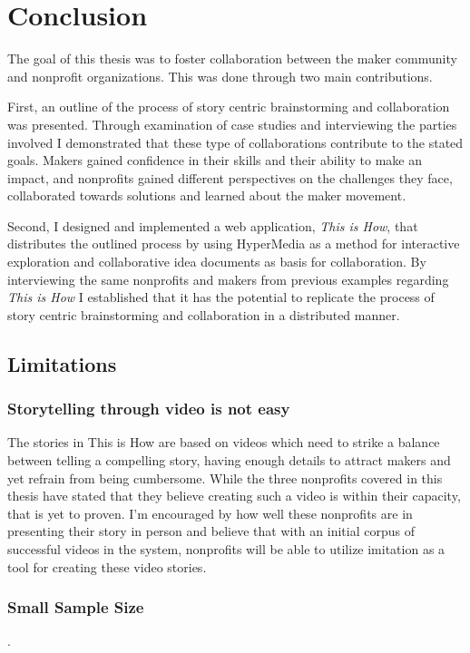 \chapter{Conclusion}
\label{chap_conclusion}

The goal of this thesis was to foster collaboration between the maker community and nonprofit organizations. This was done through two main contributions. 

First, an outline of the process of story­ centric brainstorming and collaboration was presented. Through examination of case studies and interviewing the parties involved I demonstrated that these type of collaborations contribute to the stated goals. Makers gained confidence in their skills and their ability to make an impact, and nonprofits gained different perspectives on the challenges they face, collaborated towards solutions and learned about the maker movement. 

Second, I designed and implemented a web application, \textit{This is How}, that distributes the outlined process by using HyperMedia as a method for interactive exploration and collaborative idea documents as basis for collaboration. By interviewing the same nonprofits and makers from previous examples regarding \textit{This is How} I established that it has the potential to replicate the process of story­ centric brainstorming and collaboration in a distributed manner.     

\section{Limitations}

\subsection{Storytelling through video is not easy}

The stories in  This is How are based on videos which need to strike a balance between telling a compelling story, having enough details to attract makers and yet refrain from being cumbersome. While the three nonprofits covered in this thesis have stated that they believe creating such a video is within their capacity, that is yet to proven. I'm encouraged by how well these nonprofits are in presenting their story in person and believe that with an initial corpus of successful videos in the system, nonprofits will be able to utilize imitation as a tool for creating these video stories.

\subsection{Small Sample Size}. 

